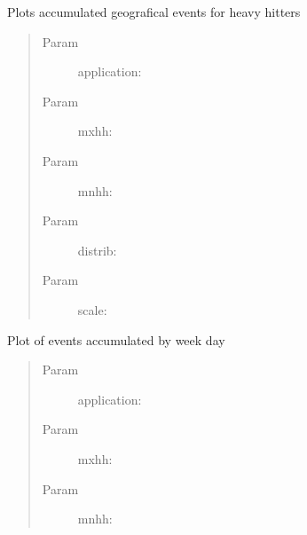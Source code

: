 \documentclass[letterpaper,10pt,english]{sphinxmanual}
\begin{document}

\begin{fulllineitems}
\label{index:SuperHubProcessing.accumulatedEventsHeavyHitters}
Plots accumulated geografical events for heavy hitters
\begin{quote}\begin{description}
\item[{Param }] \leavevmode
application:

\item[{Param }] \leavevmode
mxhh:

\item[{Param }] \leavevmode
mnhh:

\item[{Param }] \leavevmode
distrib:

\item[{Param }] \leavevmode
scale:

\end{description}\end{quote}

\end{fulllineitems}


\begin{fulllineitems}
\label{index:SuperHubProcessing.dailyHistogram}
Plot of events accumulated by week day
\begin{quote}\begin{description}
\item[{Param }] \leavevmode
application:

\item[{Param }] \leavevmode
mxhh:

\item[{Param }] \leavevmode
mnhh:

\end{description}\end{quote}

\end{fulllineitems}

\end{document}
